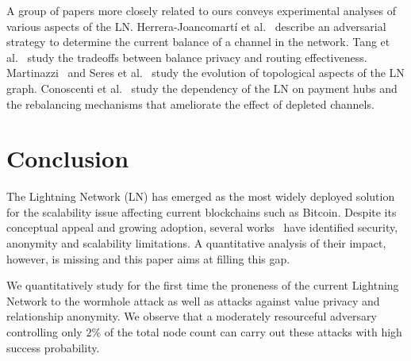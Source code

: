 A group of papers more closely related to ours conveys experimental analyses of various aspects of the LN.
Herrera-Joancomart\'{i} et al.~\cite{HerreraJoancomarti2019} describe an adversarial 
strategy to determine the current balance of a channel in the network.
Tang et al.~\cite{Tang2019} study 
the tradeoffs between balance privacy and routing effectiveness. 
Martinazzi~\cite{Martinazzi2019} and Seres et al.~\cite{Seres2019} study the evolution of topological aspects of the LN graph.
Conoscenti et al.~\cite{Conoscenti2019} study the dependency of the LN on payment hubs 
and the rebalancing mechanisms that ameliorate the effect of depleted channels.



\section{Conclusion}
\label{sec:conclusions}

The Lightning Network (LN) has emerged as the most widely deployed solution for the scalability issue affecting current blockchains such as Bitcoin. 
Despite its conceptual appeal and growing adoption,  several works~\cite{Malavolta2017, Malavolta2019} have identified 
 security, anonymity and scalability limitations. A quantitative 
analysis of their impact, however, is missing and this paper aims at filling this gap.

We quantitatively study for the first time the proneness of the current Lightning Network to the 
wormhole attack as well as attacks against value privacy and relationship anonymity. 
We observe that a moderately resourceful adversary controlling only $2\%$ of the total node count can carry out these attacks with high success probability.


